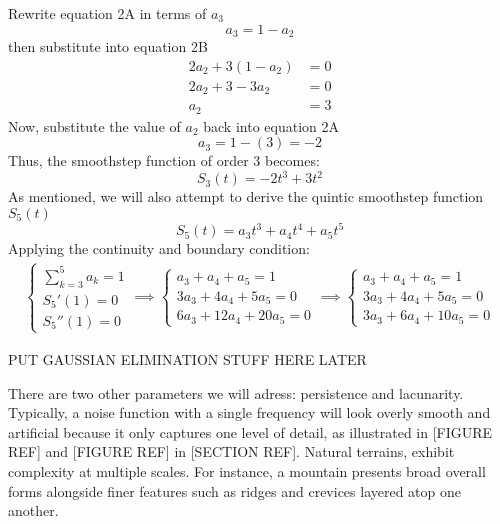 Rewrite equation 2A in terms of $a_3$
\[a_3=1-a_2\]
then substitute into equation 2B
\begin{align*}
    2a_2+3(1-a_2)&=0\\
    2a_2+3-3a_2&=0\\
    a_2&=3
\end{align*}
Now, substitute the value of $a_2$ back into equation 2A
\[a_3=1-(3)=-2\]
Thus, the smoothstep function of order 3 becomes:
\begin{equation} \label{eq:3}
    S_3 (t)=-2t^3+3t^2
\end{equation}
As mentioned, we will also attempt to derive the quintic smoothstep function $S_5(t)$
\[S_5(t)=a_3t^3+a_4t^4+a_5t^5\]
Applying the continuity and boundary condition:
\begin{align}
    \begin{cases*}
        \sum_{k=3}^{5}a_k=1 \\
        S_5'(1)=0 \\
        S_5''(1)=0
    \end{cases*}
    \implies
    \begin{cases*}
        a_3+a_4+a_5=1\\
        3a_3+4a_4+5a_5=0\\
        6a_3+12a_4+20a_5=0
    \end{cases*}
    \implies
    \begin{cases*}
        a_3+a_4+a_5=1\\
        3a_3+4a_4+5a_5=0\\
        3a_3+6a_4+10a_5=0
    \end{cases*}
\end{align}

PUT GAUSSIAN ELIMINATION STUFF HERE LATER

There are two other parameters we will adress: persistence and lacunarity. Typically, a noise function with a single frequency will look 
overly smooth and artificial because it only captures one level of detail, as illustrated in [FIGURE REF] and [FIGURE REF] in [SECTION REF].
Natural terrains, exhibit complexity at multiple scales. For instance, a mountain presents broad overall forms alongside finer features such 
as ridges and crevices layered atop one another.

